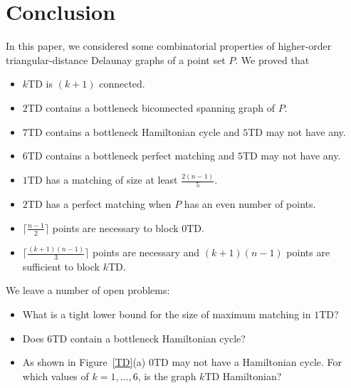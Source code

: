 \documentclass[11pt,a4paper]{article}
\newcommand{\kTD}[2]{$#1$\text{-}TD#2}
\begin{document}
\section{Conclusion}
\label{conclusion}
In this paper, we considered some combinatorial properties of higher-order triangular-distance Delaunay graphs of a point set $P$. We proved that
\begin{itemize}

  \item \kTD{k}{} is $(k+1)$ connected.
  \item \kTD{2}{} contains a bottleneck biconnected spanning graph of $P$.
  \item \kTD{7}{} contains a bottleneck Hamiltonian cycle and \kTD{5}{} may not have any.
  \item \kTD{6}{} contains a bottleneck perfect matching and \kTD{5}{} may not have any.
  \item \kTD{1}{} has a matching of size at least $\frac{2(n-1)}{5}$.
  \item \kTD{2}{} has a perfect matching when $P$ has an even number of points.
  \item $\lceil\frac{n-1}{2}\rceil$ points are necessary to block \kTD{0}{}.
  \item $\lceil\frac{(k+1)(n-1)}{3}\rceil$ points are necessary and $(k+1)(n-1)$ points are sufficient to block \kTD{k}{}.
\end{itemize}

We leave a number of open problems:
\begin{itemize}

  \item What is a tight lower bound for the size of maximum matching in \kTD{1}{}?
  \item Does \kTD{6}{} contain a bottleneck Hamiltonian cycle?
 \item As shown in Figure~\ref{TD}(a) \kTD{0}{} may not have a Hamiltonian cycle. For which values of $k=1,\dots, 6$, is the graph \kTD{k}{} Hamiltonian?
\end{itemize}



\end{document}
